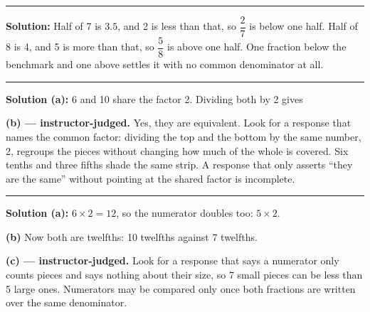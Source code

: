 \documentclass[12pt]{article}
\begin{document}
\vspace{0.15cm}\noindent\rule{\linewidth}{0.2pt}\vspace{0.15cm}


\textbf{Solution:} Half of 7 is $3.5$, and 2 is less than that, so $\dfrac{2}{7}$ is below one half. Half of 8 is 4, and 5 is more than that, so $\dfrac{5}{8}$ is above one half. One fraction below the benchmark and one above settles it with no common denominator at all. 

\vspace{0.15cm}\noindent\rule{\linewidth}{0.2pt}\vspace{0.15cm}


\textbf{Solution (a):} 6 and 10 share the factor 2. Dividing both by 2 gives 

\textbf{(b) --- instructor-judged.} Yes, they are equivalent. Look for a response that names the common factor: dividing the top and the bottom by the same number, 2, regroups the pieces without changing how much of the whole is covered. Six tenths and three fifths shade the same strip. A response that only asserts ``they are the same'' without pointing at the shared factor is incomplete.

\vspace{0.15cm}\noindent\rule{\linewidth}{0.2pt}\vspace{0.15cm}


\textbf{Solution (a):} $6 \times 2 = 12$, so the numerator doubles too: $5 \times 2$. 

\textbf{(b)} Now both are twelfths: 10 twelfths against 7 twelfths. 

\textbf{(c) --- instructor-judged.} Look for a response that says a numerator only counts pieces and says nothing about their size, so 7 small pieces can be less than 5 large ones. Numerators may be compared only once both fractions are written over the same denominator.
\end{document}
